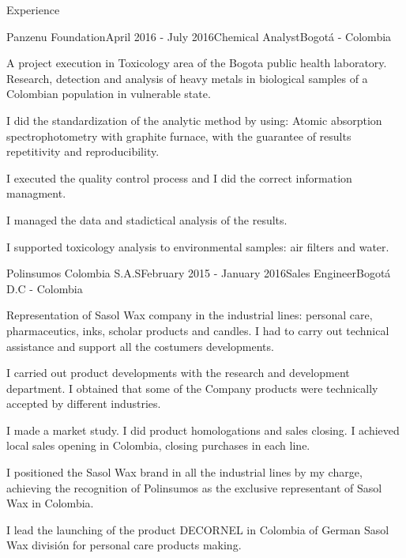 \documentclass[spanish]{resume}
\begin{document}
\begin{rSection}{Experience}


\begin{rSubsection}{Panzenu Foundation}{April 2016 - July 2016}{Chemical Analyst}{Bogot\'a - Colombia}
\item A project execution in Toxicology area of the Bogota public health laboratory. Research, detection and analysis of heavy metals in biological samples of a Colombian population in vulnerable state.
\item I did the standardization of the analytic method by using: Atomic absorption spectrophotometry with graphite furnace, with the guarantee of results repetitivity and reproducibility.
\item I executed the quality control process and I did the correct information managment.
\item I managed the data and stadictical analysis of the results. 
\item I supported toxicology analysis to environmental samples: air filters and water.
\end{rSubsection}


\begin{rSubsection}{Polinsumos Colombia S.A.S}{February 2015 - January 2016}{Sales Engineer}{Bogot\'a D.C - Colombia}
\item Representation of Sasol Wax company in the industrial lines: personal care, pharmaceutics, inks, scholar products and candles. I had to carry out technical assistance and support all the costumers developments.
\item I carried out product developments with the research and development department. I obtained that some of the Company products were technically accepted by different 	industries.
\item I made a market study. I did product homologations and sales closing. I achieved local sales opening in Colombia, closing purchases in each line.  
\item I positioned the Sasol Wax brand in all the industrial lines by my charge, achieving the recognition of Polinsumos as the exclusive representant of Sasol Wax in Colombia.
\item I lead the launching of the product DECORNEL in Colombia of German Sasol Wax división for personal care products making.
\end{rSubsection}


\end{rSection}
\end{document}
